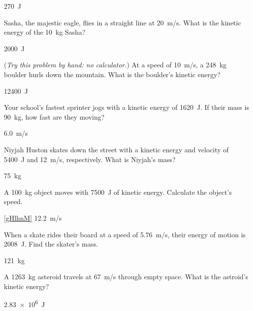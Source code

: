 \documentclass[answers]{exam}
\begin{document}
\begin{questions}
\begin{solution}
\SI{270}{J}
\end{solution}


\question \label{ixc46e}
Sasha, the majestic eagle, flies in a straight line at \SI{20}{m/s}. What is the kinetic energy of the \SI{10}{kg} Sasha? 

\begin{solution}
\SI{2000}{J}
\end{solution}


\question \label{dguWEr}
(\textit{Try this problem by hand: no calculator.}) At a speed of \SI{10}{m/s}, a \SI{248}{kg} boulder hurls down the mountain. What is the boulder's kinetic energy?

\begin{solution}
\SI{12400}{J}
\end{solution}

\question \label{rUr2P8}
Your school's fastest sprinter jogs with a kinetic energy of \SI{1620}{J}. If their mass is \SI{90}{kg}, how fast are they moving?

\begin{solution}
\SI{6.0}{m/s}
\end{solution}

\question \label{2rrR9W}
Niyjah Huston skates down the street with a kinetic energy and velocity of \SI{5400}{J} and \SI{12}{m/s}, respectively. What is Niyjah's mass?

\begin{solution}
\SI{75}{kg}
\end{solution}

\question \label{gHlhnM}
A \SI{100}{kg} object moves with \SI{7500}{J} of kinetic energy. Calculate the object's speed.

\begin{solution}
\ref{gHlhnM} \SI{12.2}{m/s}
\end{solution}


\question \label{WH6xot}
When a skate rides their board at a speed of \SI{5.76}{m/s}, their energy of motion is \SI{2008}{J}. Find the skater's mass.

\begin{solution}
\SI{121}{kg}
\end{solution}

\question \label{X7RPxf}
A \SI{1263}{kg} asteroid travels at \SI{67}{m/s} through empty space. What is the astroid's kinetic energy?

\begin{solution}
\SI{2.83e6}{J}
\end{solution}


\end{questions}
\end{document}
